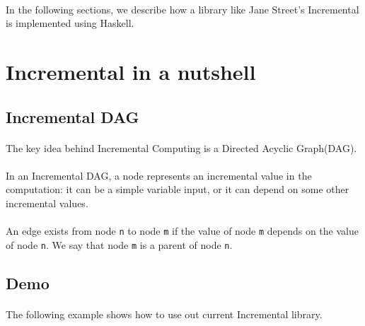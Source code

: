 \documentclass[a4paper, twocolumn]{article}
\begin{document}
\paragraph{} In the following sections, we describe how a library like Jane Street's Incremental is implemented using Haskell.

\section{Incremental in a nutshell }

\subsection{Incremental DAG}
\paragraph{} The key idea behind Incremental Computing is a Directed Acyclic Graph(DAG). 

\paragraph{} In an Incremental DAG, a node represents an incremental value in the computation: it can be a simple variable input, or it can depend on some other incremental values. 

\paragraph{} An edge exists from node \verb|n| to node \verb|m| if the value of node \verb|m| depends on the value of node \verb|n|. We say that node \verb|m| is a parent of node \verb|n|.



\subsection{Demo}
\paragraph{} The following example shows how to use out current Incremental library.
\end{document}
